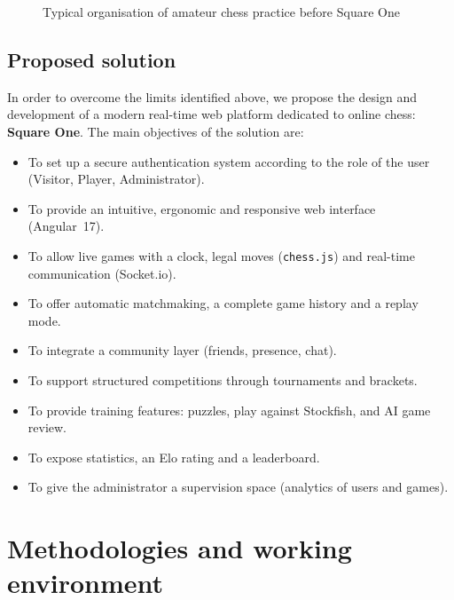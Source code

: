 \documentclass[12pt,a4paper,oneside]{report}
\begin{document}
\begin{figure}[H]
\centering
{}
\caption{Typical organisation of amateur chess practice before Square One}
\label{fig:existing-chess}
\end{figure}

\subsection{Proposed solution}
In order to overcome the limits identified above, we propose the design and development of a modern real-time web platform dedicated to online chess: \textbf{Square One}. The main objectives of the solution are:
\begin{itemize}[leftmargin=1.4em,itemsep=0.35em]
  \item To set up a secure authentication system according to the role of the user (Visitor, Player, Administrator).
  \item To provide an intuitive, ergonomic and responsive web interface (Angular~17).
  \item To allow live games with a clock, legal moves (\texttt{chess.js}) and real-time communication (Socket.io).
  \item To offer automatic matchmaking, a complete game history and a replay mode.
  \item To integrate a community layer (friends, presence, chat).
  \item To support structured competitions through tournaments and brackets.
  \item To provide training features: puzzles, play against Stockfish, and AI game review.
  \item To expose statistics, an Elo rating and a leaderboard.
  \item To give the administrator a supervision space (analytics of users and games).
\end{itemize}

\section{Methodologies and working environment}
\end{document}
